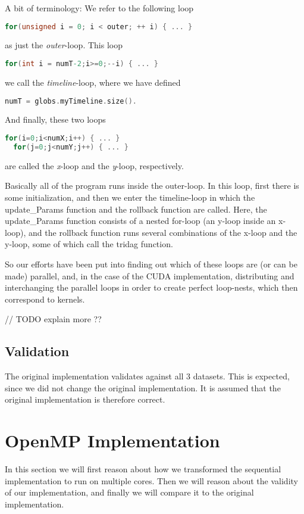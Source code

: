 \documentclass[11pt]{article}
\begin{document}
A bit of terminology: We refer to the following loop
\begin{lstlisting}[language=C]
  for(unsigned i = 0; i < outer; ++ i) { ... }
\end{lstlisting}
as just the \emph{outer}-loop. This loop
\begin{lstlisting}[language=C]
  for(int i = numT-2;i>=0;--i) { ... }
\end{lstlisting}
we call the \emph{timeline}-loop, where we have defined
\begin{lstlisting}[language=C]
  numT = globs.myTimeline.size().
\end{lstlisting}
And finally, these two loops
\begin{lstlisting}[language=C]
  for(i=0;i<numX;i++) { ... }
  for(j=0;j<numY;j++) { ... }
\end{lstlisting}
are called the \emph{x}-loop and the \emph{y}-loop, respectively.

Basically all of the program runs inside the outer-loop.
In this loop, first there is some initialization, and then we enter the timeline-loop in which the update\_Params function and the rollback function are called.
Here, the update\_Params function consists of a nested for-loop (an y-loop inside an x-loop), and the rollback function runs several combinations of the x-loop and the y-loop, some of which call the tridag function.

So our efforts have been put into finding out which of these loops are (or can be made) parallel, and, in the case of the CUDA implementation, distributing and interchanging the parallel loops in order to create perfect loop-nests, which then correspond to kernels.

// TODO explain more ??

\subsection{Validation}
The original implementation validates against all 3 datasets. This is expected,
since we did not change the original implementation. It is assumed that the 
original implementation is therefore correct.


\section{OpenMP Implementation}
In this section we will first reason about how we transformed the sequential
implementation to run on multiple cores. Then we will reason about the validity 
of our implementation, and finally we will compare it to the original 
implementation.
\end{document}
